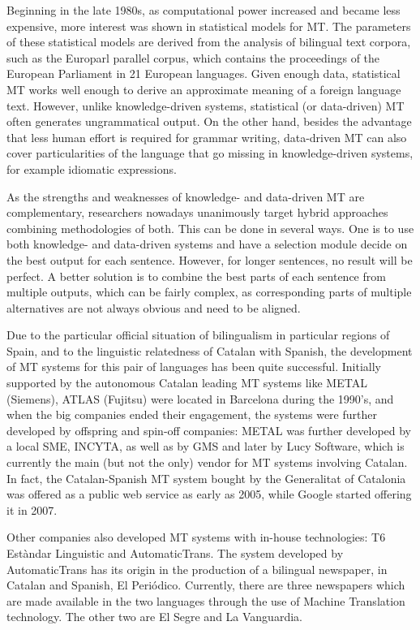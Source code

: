 \begin{multicols}{2}
Beginning in the late 1980s, as computational power increased and became less expensive, more interest was shown in statistical models for MT. The parameters of these statistical models are derived from the analysis of bilingual text corpora, such as the Europarl parallel corpus, which contains the proceedings of the European Parliament in 21 European languages. Given enough data, statistical MT works well enough to derive an approximate meaning of a foreign language text. However, unlike knowledge-driven systems, statistical (or data-driven) MT often generates ungrammatical output. On the other hand, besides the advantage that less human effort is required for grammar writing, data-driven MT can also cover particularities of the language that go missing in knowledge-driven systems, for example idiomatic expressions. 

As the strengths and weaknesses of knowledge- and data-driven MT are complementary, researchers nowadays unanimously target hybrid approaches combining methodologies of both. This can be done in several ways. One is to use both knowledge- and data-driven systems and have a selection module decide on the best output for each sentence. However, for longer sentences, no result will be perfect. A better solution is to combine the best parts of each sentence from multiple outputs, which can be fairly complex, as corresponding parts of multiple alternatives are not always obvious and need to be aligned. 

Due to the particular official situation of bilingualism in particular regions of Spain, and to the linguistic relatedness of Catalan with Spanish, the development of MT systems for this pair of languages has been quite successful. Initially supported by the autonomous Catalan leading MT systems like METAL (Siemens), ATLAS (Fujitsu) were located in Barcelona during the 1990’s, and when the big companies ended their engagement, the systems were further developed by offspring and spin-off companies: METAL was further developed by a local SME, INCYTA, as well as by GMS and later by Lucy Software, which is currently the main (but not the only) vendor for MT systems involving Catalan. In fact, the Catalan-Spanish MT system  bought by the Generalitat of Catalonia was offered as a public web service as early as 2005, while Google started offering it in 2007. 

Other companies also developed MT systems with in-house technologies: T6 Estàndar Linguistic and AutomaticTrans. The system developed by AutomaticTrans has its origin in the production of a bilingual newspaper, in Catalan and Spanish, El Periódico. Currently, there are three newspapers which are made available in the two languages  through the use of Machine Translation technology. The other two are El Segre and La Vanguardia. 


\end{multicols}
